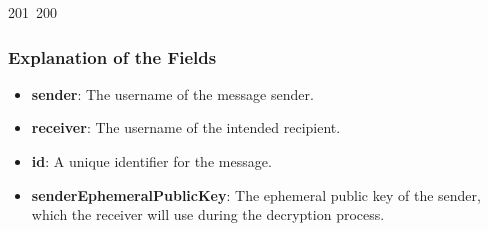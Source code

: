 201~200~\documentclass{article}
\begin{document}
	                                                                                                                                                                                                                                                                                                	                                \subsubsection{Explanation of the Fields}
	                                                                                                                                                                                                                                                                                                	                                \begin{itemize}
	                                                                                                                                                                                                                                                                                                	                                    \item \textbf{sender}: The username of the message sender.  
	                                                                                                                                                                                                                                                                                                	                                        \item \textbf{receiver}: The username of the intended recipient.  
	                                                                                                                                                                                                                                                                                                	                                            \item \textbf{id}: A unique identifier for the message.  
	                                                                                                                                                                                                                                                                                                	                                                \item \textbf{senderEphemeralPublicKey}: The ephemeral public key of the sender, which the receiver will use during the decryption process.  

\end{itemize}
\end{document}
